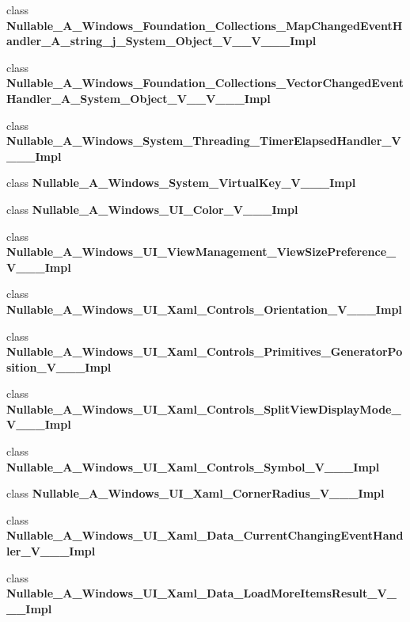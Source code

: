 \begin{DoxyCompactItemize}
\item 
class {\bfseries Nullable\+\_\+\+A\+\_\+\+Windows\+\_\+\+Foundation\+\_\+\+Collections\+\_\+\+Map\+Changed\+Event\+Handler\+\_\+\+A\+\_\+string\+\_\+j\+\_\+\+System\+\_\+\+Object\+\_\+\+V\+\_\+\+\_\+\+V\+\_\+\+\_\+\+\_\+\+Impl}
\item 
class {\bfseries Nullable\+\_\+\+A\+\_\+\+Windows\+\_\+\+Foundation\+\_\+\+Collections\+\_\+\+Vector\+Changed\+Event\+Handler\+\_\+\+A\+\_\+\+System\+\_\+\+Object\+\_\+\+V\+\_\+\+\_\+\+V\+\_\+\+\_\+\+\_\+\+Impl}
\item 
class {\bfseries Nullable\+\_\+\+A\+\_\+\+Windows\+\_\+\+System\+\_\+\+Threading\+\_\+\+Timer\+Elapsed\+Handler\+\_\+\+V\+\_\+\+\_\+\+\_\+\+Impl}
\item 
class {\bfseries Nullable\+\_\+\+A\+\_\+\+Windows\+\_\+\+System\+\_\+\+Virtual\+Key\+\_\+\+V\+\_\+\+\_\+\+\_\+\+Impl}
\item 
class {\bfseries Nullable\+\_\+\+A\+\_\+\+Windows\+\_\+\+U\+I\+\_\+\+Color\+\_\+\+V\+\_\+\+\_\+\+\_\+\+Impl}
\item 
class {\bfseries Nullable\+\_\+\+A\+\_\+\+Windows\+\_\+\+U\+I\+\_\+\+View\+Management\+\_\+\+View\+Size\+Preference\+\_\+\+V\+\_\+\+\_\+\+\_\+\+Impl}
\item 
class {\bfseries Nullable\+\_\+\+A\+\_\+\+Windows\+\_\+\+U\+I\+\_\+\+Xaml\+\_\+\+Controls\+\_\+\+Orientation\+\_\+\+V\+\_\+\+\_\+\+\_\+\+Impl}
\item 
class {\bfseries Nullable\+\_\+\+A\+\_\+\+Windows\+\_\+\+U\+I\+\_\+\+Xaml\+\_\+\+Controls\+\_\+\+Primitives\+\_\+\+Generator\+Position\+\_\+\+V\+\_\+\+\_\+\+\_\+\+Impl}
\item 
class {\bfseries Nullable\+\_\+\+A\+\_\+\+Windows\+\_\+\+U\+I\+\_\+\+Xaml\+\_\+\+Controls\+\_\+\+Split\+View\+Display\+Mode\+\_\+\+V\+\_\+\+\_\+\+\_\+\+Impl}
\item 
class {\bfseries Nullable\+\_\+\+A\+\_\+\+Windows\+\_\+\+U\+I\+\_\+\+Xaml\+\_\+\+Controls\+\_\+\+Symbol\+\_\+\+V\+\_\+\+\_\+\+\_\+\+Impl}
\item 
class {\bfseries Nullable\+\_\+\+A\+\_\+\+Windows\+\_\+\+U\+I\+\_\+\+Xaml\+\_\+\+Corner\+Radius\+\_\+\+V\+\_\+\+\_\+\+\_\+\+Impl}
\item 
class {\bfseries Nullable\+\_\+\+A\+\_\+\+Windows\+\_\+\+U\+I\+\_\+\+Xaml\+\_\+\+Data\+\_\+\+Current\+Changing\+Event\+Handler\+\_\+\+V\+\_\+\+\_\+\+\_\+\+Impl}
\item 
class {\bfseries Nullable\+\_\+\+A\+\_\+\+Windows\+\_\+\+U\+I\+\_\+\+Xaml\+\_\+\+Data\+\_\+\+Load\+More\+Items\+Result\+\_\+\+V\+\_\+\+\_\+\+\_\+\+Impl}

\end{DoxyCompactItemize}
